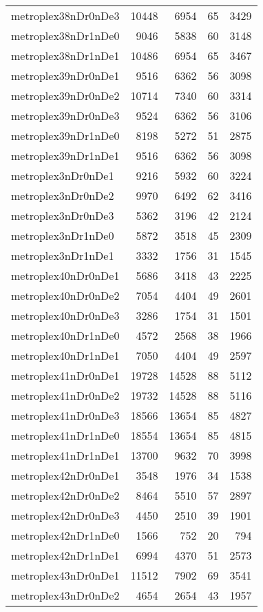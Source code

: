 \begin{tabular}{lrrrr}
metroplex38nDr0nDe3 & 10448 & 6954 & 65 & 3429 \\
metroplex38nDr1nDe0 & 9046 & 5838 & 60 & 3148 \\
metroplex38nDr1nDe1 & 10486 & 6954 & 65 & 3467 \\
metroplex39nDr0nDe1 & 9516 & 6362 & 56 & 3098 \\
metroplex39nDr0nDe2 & 10714 & 7340 & 60 & 3314 \\
metroplex39nDr0nDe3 & 9524 & 6362 & 56 & 3106 \\
metroplex39nDr1nDe0 & 8198 & 5272 & 51 & 2875 \\
metroplex39nDr1nDe1 & 9516 & 6362 & 56 & 3098 \\
metroplex3nDr0nDe1 & 9216 & 5932 & 60 & 3224 \\
metroplex3nDr0nDe2 & 9970 & 6492 & 62 & 3416 \\
metroplex3nDr0nDe3 & 5362 & 3196 & 42 & 2124 \\
metroplex3nDr1nDe0 & 5872 & 3518 & 45 & 2309 \\
metroplex3nDr1nDe1 & 3332 & 1756 & 31 & 1545 \\
metroplex40nDr0nDe1 & 5686 & 3418 & 43 & 2225 \\
metroplex40nDr0nDe2 & 7054 & 4404 & 49 & 2601 \\
metroplex40nDr0nDe3 & 3286 & 1754 & 31 & 1501 \\
metroplex40nDr1nDe0 & 4572 & 2568 & 38 & 1966 \\
metroplex40nDr1nDe1 & 7050 & 4404 & 49 & 2597 \\
metroplex41nDr0nDe1 & 19728 & 14528 & 88 & 5112 \\
metroplex41nDr0nDe2 & 19732 & 14528 & 88 & 5116 \\
metroplex41nDr0nDe3 & 18566 & 13654 & 85 & 4827 \\
metroplex41nDr1nDe0 & 18554 & 13654 & 85 & 4815 \\
metroplex41nDr1nDe1 & 13700 & 9632 & 70 & 3998 \\
metroplex42nDr0nDe1 & 3548 & 1976 & 34 & 1538 \\
metroplex42nDr0nDe2 & 8464 & 5510 & 57 & 2897 \\
metroplex42nDr0nDe3 & 4450 & 2510 & 39 & 1901 \\
metroplex42nDr1nDe0 & 1566 & 752 & 20 & 794 \\
metroplex42nDr1nDe1 & 6994 & 4370 & 51 & 2573 \\
metroplex43nDr0nDe1 & 11512 & 7902 & 69 & 3541 \\
metroplex43nDr0nDe2 & 4654 & 2654 & 43 & 1957 \\

\end{tabular}
